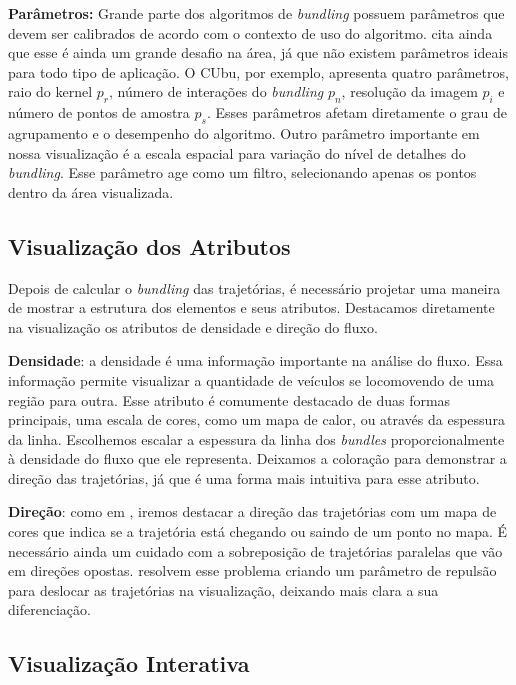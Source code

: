 \textbf{Parâmetros:} Grande parte dos algoritmos de \emph{bundling} possuem
parâmetros que devem ser calibrados de acordo com o contexto de uso do
algoritmo. \citet{Lhuillier2017} cita ainda que esse é ainda um grande desafio
na área, já que não existem parâmetros ideais para todo tipo de aplicação. O
CUbu, por exemplo, apresenta quatro parâmetros, raio do kernel $p_r$, número de
interações do \emph{bundling} $p_n$, resolução da imagem $p_i$ e número de
pontos de amostra $p_s$. Esses parâmetros afetam diretamente o grau de
agrupamento e o desempenho do algoritmo. Outro parâmetro importante em nossa
visualização é a escala espacial para variação do nível de detalhes do
\emph{bundling}. Esse parâmetro age como um filtro, selecionando apenas os pontos
dentro da área visualizada.

\subsection{Visualização dos Atributos}
Depois de calcular o \emph{bundling} das trajetórias, é necessário projetar uma
maneira de mostrar a estrutura dos elementos e seus atributos. Destacamos
diretamente na visualização os atributos de densidade e direção do fluxo.

\textbf{Densidade}: a densidade é uma informação importante na análise
do fluxo. Essa informação permite visualizar a quantidade de veículos se
locomovendo de uma região para outra. Esse atributo é comumente destacado de
duas formas principais, uma escala de cores, como um mapa de calor, ou através
da espessura da linha. Escolhemos escalar a espessura da linha dos
\emph{bundles} proporcionalmente à densidade do fluxo que ele representa.
Deixamos a coloração para demonstrar a direção das trajetórias, já que é uma
forma mais intuitiva para esse atributo.

\textbf{Direção}: como em \citet{Anita2017}, iremos destacar a direção das
trajetórias com um mapa de cores que indica se a trajetória está chegando ou
saindo de um ponto no mapa. É necessário ainda um cuidado com a sobreposição de
trajetórias paralelas que vão em direções opostas. \citet{Anita2017} resolvem
esse problema criando um parâmetro de repulsão para deslocar as trajetórias na
visualização, deixando mais clara a sua diferenciação.

\subsection{Visualização Interativa}

